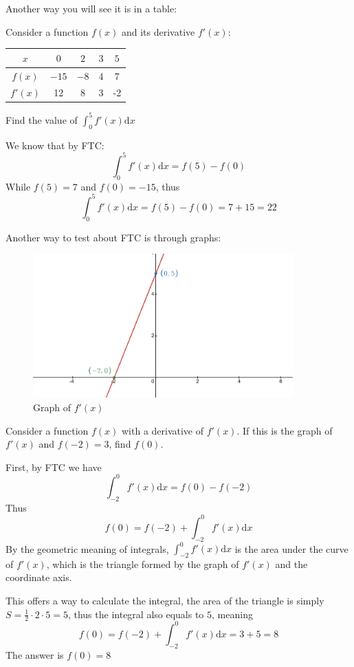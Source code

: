 \documentclass{article}
\begin{document}
Another way you will see it is in a table:

Consider a function $f(x)$ and its derivative $f'(x)$:
\begin{center}
    \begin{tabular}{||c c c c c||} 
     \hline
     $x$ & $0$ & $2$ & $3$ & $5$\\ [0.5ex] 
     \hline\hline
     $f(x)$ & $-15$ & $-8$ & $4$ & $7$\\ 
     \hline
     $f'(x)$ & 12 & 8 & 3 & -2\\
     \hline
    \end{tabular}
    \end{center}
Find the value of $\displaystyle \int_{0}^{5} f'(x)\mathrm{d}x$

We know that by FTC:
\[
    \int_{0}^{5} f'(x)\mathrm{d}x = f(5) - f(0)
\]
While $f(5) = 7$ and $f(0) = -15$, thus
\[
    \int_{0}^{5} f'(x)\mathrm{d}x = f(5) - f(0) = 7+15 = 22
\]

\newpage
Another way to test about FTC is through graphs:
\begin{figure}[H]
    \includegraphics[width = 10cm]{img.png}
    \centering
    \caption{Graph of $f'(x)$}
\end{figure}
Consider a function $f(x)$ with a derivative of $f'(x)$. If this is the graph of $f'(x)$ and $f(-2) = 3$, find $f(0)$.

First, by FTC we have
\[
\int_{-2}^{0}f'(x)\mathrm{d}x = f(0) - f(-2)
\]
Thus
\[
f(0) = f(-2) + \int_{-2}^{0} f'(x)\mathrm{d}x
\]
By the geometric meaning of integrals, $\displaystyle \int_{-2}^{0} f'(x)\mathrm{d}x$ is the area under the curve of $f'(x)$, 
which is the triangle formed by the graph of $f'(x)$ and the coordinate axis.

This offers a way to calculate the integral, the area of the triangle is simply $\displaystyle S = \frac{1}{2}\cdot 2 \cdot 5 = 5$,
thus the integral also equals to $5$, meaning
\[
    f(0) = f(-2) + \int_{-2}^{0} f'(x)\mathrm{d}x = 3 + 5 = 8
\]
The answer is $f(0) = 8$
\end{document}
